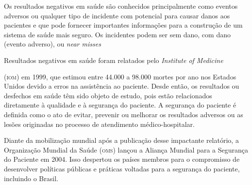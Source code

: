 \documentclass{article}
\begin{document}

Os resultados negativos em saúde são conhecidos principalmente como eventos adversos ou
        qualquer tipo de incidente com potencial para causar danos aos pacientes %
 e que pode fornecer importantes informações para a construção de um sistema de saúde
        mais seguro. %
 Os incidentes podem ser sem dano, com dano (evento adverso), ou %
\textit{near
          misses}


Resultados negativos em saúde foram relatados pelo %
\textit{Institute of Medicine}

        (\textsc{iom}) em 1999, %
 que estimou entre 44.000 a 98.000 mortes por ano nos Estados Unidos devido a erros
        na assistência ao paciente. Desde então, os resultados ou desfechos em saúde têm sido objeto
        de estudo, pois estão relacionados diretamente à qualidade e à segurança do paciente. A
        segurança do paciente é definida como o ato de evitar, prevenir ou melhorar os resultados
        adversos ou as lesões originadas no processo de atendimento médico-hospitalar. %


Diante da mobilização mundial após a publicação desse impactante relatório, a Organização
        Mundial da Saúde (\textsc{oms}) lançou a Aliança Mundial para a Segurança do Paciente em 2004. %
 Isso despertou os países membros para o compromisso de desenvolver políticas
        públicas e práticas voltadas para a segurança do paciente, incluindo o Brasil.
\end{document}
